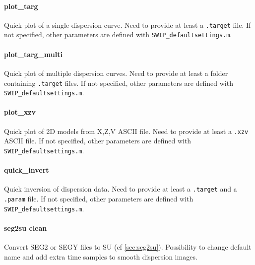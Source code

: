 \documentclass[twoside,a4paper]{article}
\begin{document}
\paragraph{plot\_targ}
Quick plot of a single dispersion curve. Need to provide at least a \verb|.target| file. If not specified, other parameters are defined with \verb|SWIP_defaultsettings.m|.

\paragraph{plot\_targ\_multi}
Quick plot of multiple dispersion curves. Need to provide at least a folder containing \verb|.target| files. If not specified, other parameters are defined with \verb|SWIP_defaultsettings.m|.

\paragraph{plot\_xzv}
Quick plot of 2D models from X,Z,V ASCII file. Need to provide at least a \verb|.xzv| ASCII file. If not specified, other parameters are defined with \verb|SWIP_defaultsettings.m|.

\paragraph{quick\_invert}
Quick inversion of dispersion data. Need to provide at least a \verb|.target| and a \verb|.param| file. If not specified, other parameters are defined with \verb|SWIP_defaultsettings.m|.

\paragraph{seg2su clean}
Convert SEG2 or SEGY files to SU (cf \ref{sec:seg2su}). Possibility to change default name and add extra time samples to smooth dispersion images.
\end{document}
